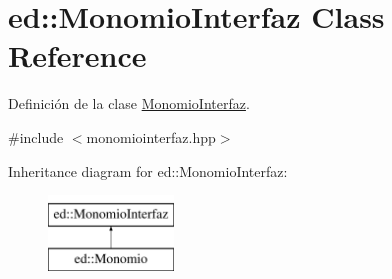 \hypertarget{classed_1_1MonomioInterfaz}{\section{ed\-:\-:Monomio\-Interfaz Class Reference}
\label{classed_1_1MonomioInterfaz}
}


Definición de la clase \hyperlink{classed_1_1MonomioInterfaz}{Monomio\-Interfaz}.  




{\ttfamily \#include $<$monomiointerfaz.\-hpp$>$}

Inheritance diagram for ed\-:\-:Monomio\-Interfaz\-:\begin{figure}[H]
\begin{center}
\leavevmode
\includegraphics[height=2.000000cm]{classed_1_1MonomioInterfaz}
\end{center}
\end{figure}
